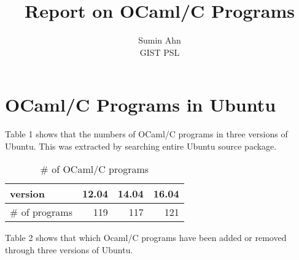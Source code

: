 \documentclass[11pt,a4paper]{article}
\begin{document}
\title{Report on OCaml/C Programs }
\author{Sumin Ahn\\GIST PSL}

\maketitle

\section{OCaml/C Programs in Ubuntu}
Table 1 shows that the numbers of OCaml/C programs in three versions of Ubuntu.
This was extracted by searching entire Ubuntu source package.

\begin{table}[h,t]
\centering
\begin{tabular}{| l| r |r| r|}
 \hline
 version & 12.04 & 14.04 & 16.04\\
 \hline
 \# of programs & 119 & 117 & 121\\
 \hline
 
\end{tabular}
\caption{\# of OCaml/C programs}
\end{table}


Table 2 shows that which Ocaml/C programs have been added or removed through three versions of Ubuntu.
\end{document}
